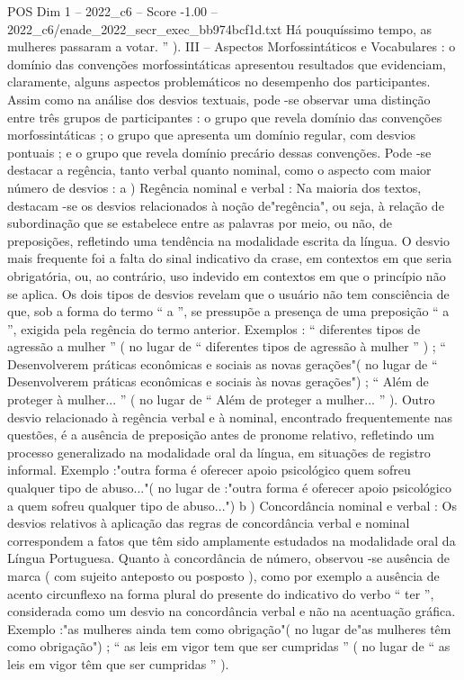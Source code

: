 \begin{textsample}{POS Dim 1 – 2022\_c6 – Score -1.00 – 2022\_c6/enade\_2022\_secr\_exec\_bb974bcf1d.txt}
Há pouquíssimo tempo, as mulheres passaram a votar. ” ).
III – Aspectos Morfossintáticos e Vocabulares : o domínio das convenções morfossintáticas apresentou resultados que evidenciam, claramente, alguns aspectos problemáticos no desempenho dos participantes.
Assim como na análise dos desvios textuais, pode -se observar uma distinção entre três grupos de participantes : o grupo que revela domínio das convenções morfossintáticas ; o grupo que apresenta um domínio regular, com desvios pontuais ; e o grupo que revela domínio precário dessas convenções.
Pode -se destacar a regência, tanto verbal quanto nominal, como o aspecto com maior número de desvios : a ) Regência nominal e verbal : Na maioria dos textos, destacam -se os desvios relacionados à noção de"regência", ou seja, à relação de subordinação que se estabelece entre as palavras por meio, ou não, de preposições, refletindo uma tendência na modalidade escrita da língua.
O desvio mais frequente foi a falta do sinal indicativo da crase, em contextos em que seria obrigatória, ou, ao contrário, uso indevido em contextos em que o princípio não se aplica.
Os dois tipos de desvios revelam que o usuário não tem consciência de que, sob a forma do termo “ a ”, se pressupõe a presença de uma preposição “ a ”, exigida pela regência do termo anterior.
Exemplos : “ diferentes tipos de agressão a mulher ” ( no lugar de “ diferentes tipos de agressão à mulher ” ) ; “ Desenvolverem práticas econômicas e sociais as novas gerações"( no lugar de “ Desenvolverem práticas econômicas e sociais às novas gerações") ; “ Além de proteger à mulher... ” ( no lugar de “ Além de proteger a mulher... ” ).
Outro desvio relacionado à regência verbal e à nominal, encontrado frequentemente nas questões, é a ausência de preposição antes de pronome relativo, refletindo um processo generalizado na modalidade oral da língua, em situações de registro informal.
Exemplo :"outra forma é oferecer apoio psicológico quem sofreu qualquer tipo de abuso..."( no lugar de :"outra forma é oferecer apoio psicológico a quem sofreu qualquer tipo de abuso...") b ) Concordância nominal e verbal : Os desvios relativos à aplicação das regras de concordância verbal e nominal correspondem a fatos que têm sido amplamente estudados na modalidade oral da Língua Portuguesa.
Quanto à concordância de número, observou -se ausência de marca ( com sujeito anteposto ou posposto ), como por exemplo a ausência de acento circunflexo na forma plural do presente do indicativo do verbo “ ter ”, considerada como um desvio na concordância verbal e não na acentuação gráfica.
Exemplo :"as mulheres ainda tem como obrigação"( no lugar de"as mulheres têm como obrigação") ; “ as leis em vigor tem que ser cumpridas ” ( no lugar de “ as leis em vigor têm que ser cumpridas ” ).

\end{textsample}
